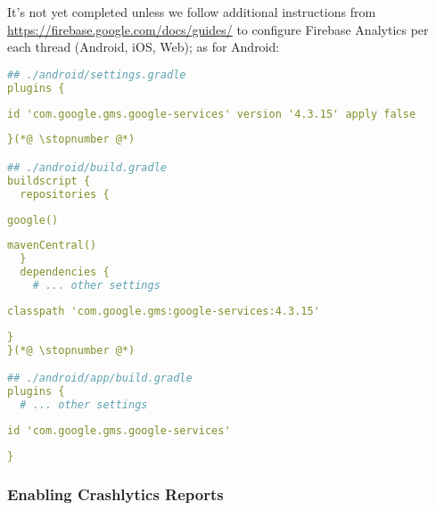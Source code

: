 \noindent It's not yet completed unless we follow additional instructions from  
\href{https://firebase.google.com/docs/guides/}{https://firebase.google.com/docs/guides/} to configure
Firebase Analytics per each thread (Android, iOS, Web); as for Android:

\begin{lstlisting}[language=yaml]
## ./android/settings.gradle
plugins {
\end{lstlisting}
{
\xpretocmd{\lstlisting}{\vspace{-12pt}}{}{}
\begin{lstlisting}[firstnumber=3, language=yaml, backgroundcolor=\color{backgreen}]
    id 'com.google.gms.google-services' version '4.3.15' apply false
\end{lstlisting}
\begin{lstlisting}[firstnumber=4, language=yaml]
}(*@ \stopnumber @*)

## ./android/build.gradle
buildscript {
  repositories {
\end{lstlisting}
\begin{lstlisting}[firstnumber=4, language=yaml, backgroundcolor=\color{backgreen}]
    google()
\end{lstlisting}
\begin{lstlisting}[firstnumber=5, language=yaml]
    mavenCentral()
  }
  dependencies {
    # ... other settings
\end{lstlisting}
\begin{lstlisting}[firstnumber=9, language=yaml, backgroundcolor=\color{backgreen}]
    classpath 'com.google.gms:google-services:4.3.15'
\end{lstlisting}
\begin{lstlisting}[firstnumber=10, language=yaml]
  }
}(*@ \stopnumber @*)

## ./android/app/build.gradle
plugins {
  # ... other settings
\end{lstlisting}
\begin{lstlisting}[firstnumber=4, language=yaml, backgroundcolor=\color{backgreen}]
  id 'com.google.gms.google-services'
\end{lstlisting}
\begin{lstlisting}[firstnumber=5, language=yaml]
}
\end{lstlisting}
}


\subsubsection{Enabling Crashlytics Reports}

